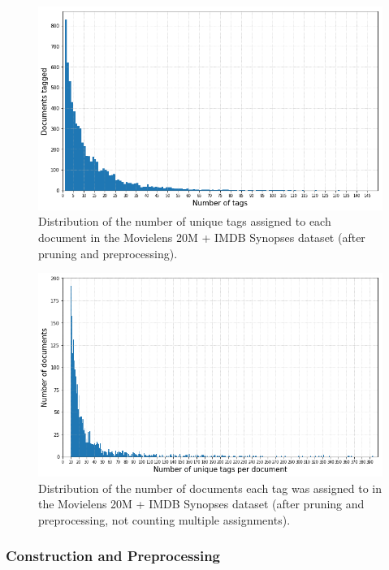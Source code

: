 \begin{figure}[H]
    \centering
    \includegraphics[width=\textwidth]{chapters/05_experiments/images/movielens_tags_per_resource.png}
    \caption{Distribution of the number of unique tags assigned to each document in the Movielens 20M + IMDB Synopses dataset (after pruning and preprocessing).}
    \label{fig:delicious_tag_doc_distr}
\end{figure}

\begin{figure}[H]
    \centering
    \includegraphics[width=\textwidth]{chapters/05_experiments/images/movielens_resources_per_tag.png}
    \caption{Distribution of the number of documents each tag was assigned to in the Movielens 20M + IMDB Synopses dataset (after pruning and preprocessing, not counting multiple assignments).}
    \label{fig:delicious_tag_doc_distr}
\end{figure}

\subsubsection{Construction and Preprocessing}

